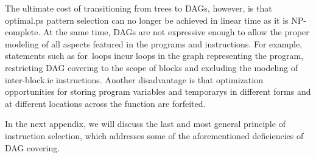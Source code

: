 The ultimate cost of transitioning from \glspl{tree} to \glspl{DAG}, however, is
that \gls{optimal.ps} \gls{pattern selection} can no longer be achieved in
linear time as it is NP-complete.
%
At the same time, \glspl{DAG} are not expressive enough to allow the proper
modeling of all aspects featured in the \glspl{program} and \glspl{instruction}.
%
For example, statements such as \mbox{for loops} incur \glspl{loop} in the
\gls{graph} representing the \gls{program}, restricting \gls{DAG covering} to
the scope of \glspl{block} and excluding the modeling of \gls{inter-block.ic}
\glspl{instruction}.
%
Another disadvantage is that optimization opportunities for storing
\gls{program} variables and \glspl{temporary} in different forms and at
different locations across the \gls{function} are forfeited.

In the next appendix, we will discuss the last and most general \gls{principle}
of \gls{instruction selection}, which addresses some of the aforementioned
deficiencies of \gls{DAG covering}.
